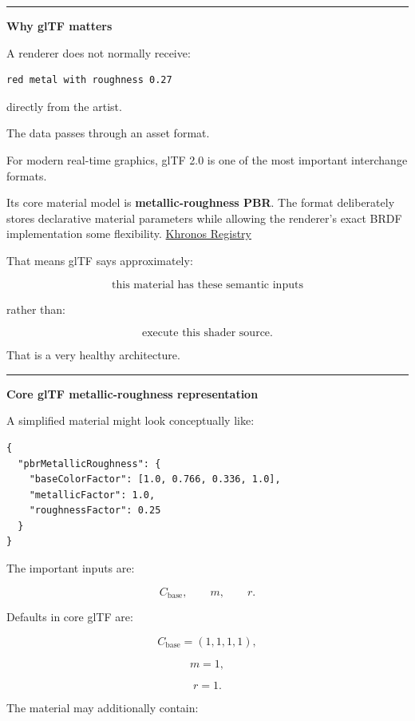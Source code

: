 \begin{center}\rule{0.5\linewidth}{0.5pt}\end{center}

\textbf{Why glTF matters}

A renderer does not normally receive:

\begin{verbatim}
red metal with roughness 0.27
\end{verbatim}

directly from the artist.

The data passes through an asset format.

For modern real-time graphics, glTF 2.0 is one of the most important interchange formats.

Its core material model is \textbf{metallic-roughness PBR}. The format deliberately stores declarative material parameters while allowing the renderer's exact BRDF implementation some flexibility. \href{https://registry.khronos.org/glTF/specs/2.0/glTF-2.0.html?utm_source=chatgpt.com}{Khronos Registry}

That means glTF says approximately:

\[
\text{this material has these semantic inputs}
\]

rather than:

\[
\text{execute this shader source}.
\]

That is a very healthy architecture.

\begin{center}\rule{0.5\linewidth}{0.5pt}\end{center}

\textbf{Core glTF metallic-roughness representation}

A simplified material might look conceptually like:

\begin{verbatim}
{
  "pbrMetallicRoughness": {
    "baseColorFactor": [1.0, 0.766, 0.336, 1.0],
    "metallicFactor": 1.0,
    "roughnessFactor": 0.25
  }
}
\end{verbatim}

The important inputs are:

\[
C_{\text{base}},
\qquad
m,
\qquad
r.
\]

Defaults in core glTF are:

\[
C_{\text{base}}=(1,1,1,1),
\]

\[
m=1,
\]

\[
r=1.
\]

The material may additionally contain:

